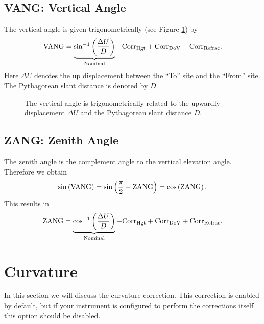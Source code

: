 \subsection{VANG: Vertical Angle} \label{subsection:VANG}
The vertical angle is given trigonometrically (see Figure \ref{Fig:VANG}) by
\begin{equation}
\text{VANG} =\underbrace{\sin^{-1}\left(\frac{\Delta U}{D}\right)}_{\text{Nominal}}+\text{Corr}_{\text{Hgt}}+\text{Corr}_{\text{DoV}}+\text{Corr}_{\text{Refrac}}.
\end{equation}
Here $\Delta U$ denotes the up displacement between the ``To'' site and the ``From'' site.  The Pythagorean slant distance is denoted by $D$.
\begin{figure}[!htbp]
\centering
{}
\caption{The vertical angle is trigonometrically related to the upwardly displacement $\Delta U$ and the Pythagorean slant distance $D$.}
\label{Fig:VANG}
\end{figure}
\subsection{ZANG: Zenith Angle}
The zenith angle is the complement angle to the vertical elevation angle.  Therefore we obtain
\begin{equation}
\sin\left(\text{VANG}\right)=\sin\left(\frac{\pi}{2}-\text{ZANG}\right)=\cos\left(\text{ZANG}\right).
\end{equation}
This results in 
\begin{equation}
\text{ZANG}=\underbrace{\cos^{-1}\left(\frac{\Delta U}{D}\right)}_{\text{Nominal}}+\text{Corr}_{\text{Hgt}}+\text{Corr}_{\text{DoV}}+\text{Corr}_{\text{Refrac}}.
\end{equation}
\section{Curvature}
In this section we will discuss the curvature correction.  This correction is enabled by default, but if your instrument is configured to perform the corrections itself this option should be disabled.
